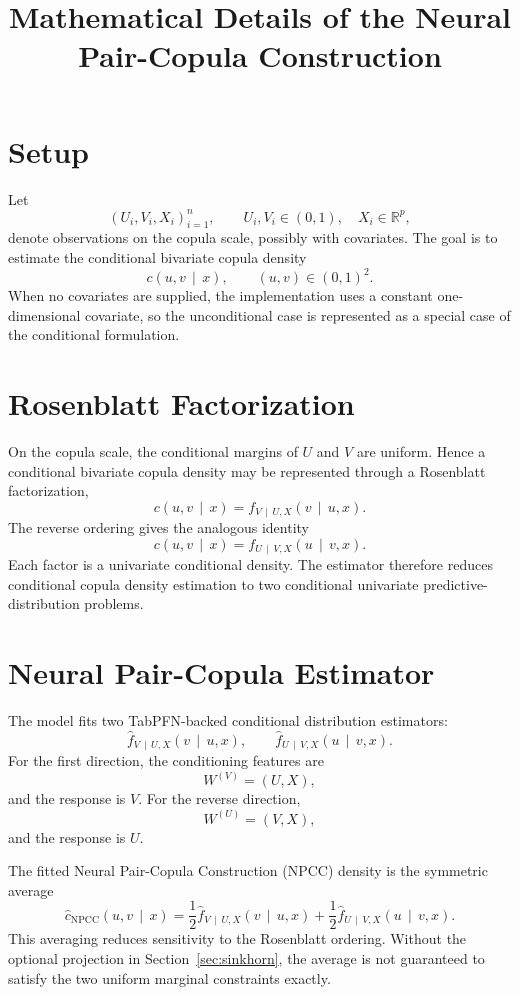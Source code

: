 \documentclass[11pt]{article}
\title{Mathematical Details of the Neural Pair-Copula Construction}
\author{}
\date{}
\newcommand{\R}{\mathbb{R}}
\newcommand{\given}{\,\mid\,}
\newcommand{\npcc}{\mathrm{NPCC}}
\begin{document}
\maketitle

\section{Setup}

Let
\[
  (U_i,V_i,X_i)_{i=1}^n,
  \qquad
  U_i,V_i \in (0,1), \quad X_i \in \R^p,
\]
denote observations on the copula scale, possibly with covariates.
The goal is to estimate the conditional bivariate copula density
\[
  c(u,v \given x),
  \qquad (u,v) \in (0,1)^2.
\]
When no covariates are supplied, the implementation uses a constant
one-dimensional covariate, so the unconditional case is represented as
a special case of the conditional formulation.

\section{Rosenblatt Factorization}

On the copula scale, the conditional margins of $U$ and $V$ are uniform.
Hence a conditional bivariate copula density may be represented through a
Rosenblatt factorization,
\[
  c(u,v \given x)
  =
  f_{V \given U,X}(v \given u,x).
\]
The reverse ordering gives the analogous identity
\[
  c(u,v \given x)
  =
  f_{U \given V,X}(u \given v,x).
\]
Each factor is a univariate conditional density. The estimator therefore
reduces conditional copula density estimation to two conditional
univariate predictive-distribution problems.

\section{Neural Pair-Copula Estimator}

The model fits two TabPFN-backed conditional distribution estimators:
\[
  \widehat f_{V \given U,X}(v \given u,x),
  \qquad
  \widehat f_{U \given V,X}(u \given v,x).
\]
For the first direction, the conditioning features are
\[
  W^{(V)} = (U,X),
\]
and the response is $V$. For the reverse direction,
\[
  W^{(U)} = (V,X),
\]
and the response is $U$.

The fitted Neural Pair-Copula Construction (NPCC) density is the
symmetric average
\[
  \widehat c_{\npcc}(u,v \given x)
  =
  \frac{1}{2}\widehat f_{V \given U,X}(v \given u,x)
  +
  \frac{1}{2}\widehat f_{U \given V,X}(u \given v,x).
  \label{eq:symmetric-density}
\]
This averaging reduces sensitivity to the Rosenblatt ordering. Without
the optional projection in Section~\ref{sec:sinkhorn}, the average is
not guaranteed to satisfy the two uniform marginal constraints exactly.
\end{document}
